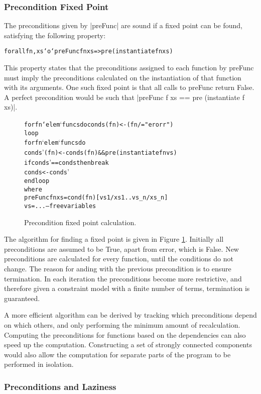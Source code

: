 \documentclass[preprint]{sigplanconf}
\newcommand{\C}[1]{\textsf{#1}}
\newenvironment{code}{\begin{alltt}\small}{\end{alltt}}
\begin{document}
\subsubsection{Precondition Fixed Point}

The preconditions given by |preFunc| are sound if a fixed point can be found, satisfying the following property:

\begin{code}
forall fn, xs `o` preFunc fn xs => pre (instantiate fn xs)
\end{code}

This property states that the preconditions assigned to each function by \C{preFunc} must imply the preconditions calculated on the instantiation of that function with its arguments. One such fixed point is that all calls to \C{preFunc} return False. A perfect precondition would be such that |preFunc f xs == pre (instantiate f xs)|.

\begin{figure}
\begin{code}
for fn `elem` funcs do conds(fn) <- (fn /= "erorr")
loop
    for fn `elem` funcs do
        conds'(fn) <- conds(fn) && pre (instantiate fn vs)
    if conds' == conds then break
    conds <- conds'
end loop
    where
        preFunc fn xs = cond(fn)[vs1/xs1 .. vs_n/xs_n]
        vs = ... -- free variables
\end{code}
\caption{Precondition fixed point calculation.}
\label{fig:precond_fixp}
\end{figure}

The algorithm for finding a fixed point is given in Figure \ref{fig:precond_fixp}. Initially all preconditions are assumed to be True, apart from \C{error}, which is False. New preconditions are calculated for every function, until the conditions do not change. The reason for anding with the previous precondition is to ensure termination. In each iteration the preconditions become more restrictive, and therefore given a constraint model with a finite number of terms, termination is guaranteed.

A more efficient algorithm can be derived by tracking which preconditions depend on which others, and only performing the minimum amount of recalculation. Computing the preconditions for functions based on the dependencies can also speed up the computation. Constructing a set of strongly connected components would also allow the computation for separate parts of the program to be performed in isolation.

\subsubsection{Preconditions and Laziness}
\end{document}
